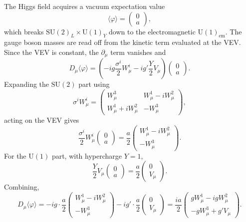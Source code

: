 The Higgs field acquires a vacuum expectation value
\begin{equation}
	\langle\varphi\rangle = \begin{pmatrix}0\\a\end{pmatrix},
\end{equation}
which breaks $\mathrm{SU}(2)_L\times\mathrm{U}(1)_Y$ down to the
electromagnetic $\mathrm{U}(1)_{\text{em}}$. The gauge boson masses are
read off from the kinetic term evaluated at the VEV. Since the VEV is
constant, the $\partial_\mu$ term vanishes and
\begin{equation}
	D_\mu\langle\varphi\rangle
	= \left(-ig\frac{\sigma^i}{2}W_\mu^i
	- ig'\frac{Y}{2}V_\mu\right)\begin{pmatrix}0\\a\end{pmatrix}.
\end{equation}
Expanding the $\mathrm{SU}(2)$ part using
\begin{equation}
	\sigma^i W_\mu^i =
	\begin{pmatrix}W_\mu^3          & W_\mu^1-iW_\mu^2 \\
	               W_\mu^1+iW_\mu^2 & -W_\mu^3\end{pmatrix},
\end{equation}
acting on the VEV gives
\begin{equation}
	\frac{\sigma^i}{2}W_\mu^i\begin{pmatrix}0\\a\end{pmatrix}
	= \frac{a}{2}\begin{pmatrix}W_\mu^1-iW_\mu^2\\-W_\mu^3\end{pmatrix}.
\end{equation}
For the $\mathrm{U}(1)$ part, with hypercharge $Y=1$,
\begin{equation}
	\frac{Y}{2}V_\mu\begin{pmatrix}0\\a\end{pmatrix}
	= \frac{a}{2}\begin{pmatrix}0\\V_\mu\end{pmatrix}.
\end{equation}
Combining,
\begin{equation}
	D_\mu\langle\varphi\rangle
	= -ig\cdot\frac{a}{2}
	\begin{pmatrix}W_\mu^1-iW_\mu^2\\-W_\mu^3\end{pmatrix}
	- ig'\cdot\frac{a}{2}\begin{pmatrix}0\\V_\mu\end{pmatrix}
	= \frac{ia}{2}\begin{pmatrix}gW_\mu^1-igW_\mu^2 \\
		-gW_\mu^3+g'V_\mu\end{pmatrix}.
\end{equation}
